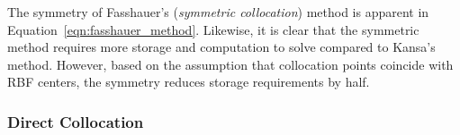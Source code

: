 \documentclass{report}
\begin{document}
{The symmetry of Fasshauer's (\emph{symmetric collocation}) method is apparent in Equation~\ref{eqn:fasshauer_method}. Likewise, it is clear that the symmetric method requires more storage and computation to solve compared to Kansa's method. However, based on the assumption that collocation points coincide with RBF centers, the symmetry reduces storage requirements by half. 
 
 
\subsubsection{Direct Collocation}

}
\end{document}
